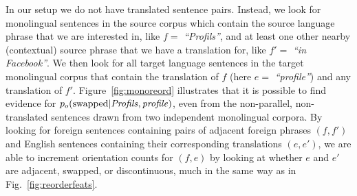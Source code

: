 \documentclass[11pt,letterpaper]{article}
\newcommand{\figref}[1]{Figure~\ref{#1}}
\newcommand{\emq}[1]{\emph{``#1''}}
\begin{document}
In our setup we do not have translated sentence pairs.  Instead, we look for monolingual sentences in the source corpus which contain the source language phrase that we are interested in, like $f =$ \emq{Profils}, and at least one other nearby (contextual) source phrase that we have a translation for, like $f' =$ \emq{in Facebook}.  We then look for all target language sentences in the target monolingual corpus that contain the translation of $f$ (here $e =$ \emq{profile}) and any translation of $f'$.  \figref{fig:monoreord} illustrates that it is possible to find evidence for $p_o(\textnormal{swapped}| \it{ Profils},\it{ profile})$, even from the non-parallel, non-translated sentences drawn from two independent monolingual corpora.  By looking for foreign sentences containing pairs of adjacent foreign phrases $(f, f')$ and English sentences containing their corresponding translations $(e, e')$, we are able to increment orientation counts for $(f, e)$ by looking at whether $e$ and $e'$ are adjacent, swapped, or discontinuous, much in the same way as in Fig.~\ref{fig:reorderfeats}.







\end{document}
